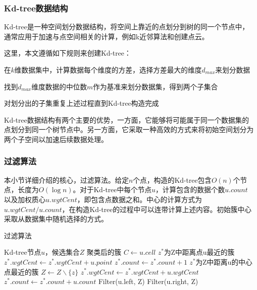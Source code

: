 \subsubsection{Kd-tree数据结构}
Kd-tree是一种空间划分数据结构，将空间上靠近的点划分到树的同一个节点中\cite{el2020kd}，通常应用于加速与点空间相关的计算，例如k近邻算法和创建点云。

这里，本文遵循如下规则来创建Kd-tree：
\begin{compactitem}
	\item 在$ k$维数据集中，计算数据每个维度的方差，选择方差最大的维度$ d_{max} $来划分数据
	\item 找到$ d_{max} $维度数据的中位数$ m $作为基准来划分数据集，得到两个子集合
	\item 对划分出的子集重复上述过程直到Kd-tree构造完成
\end{compactitem}

Kd-tree数据结构有两个主要的优势，一方面，它能够将可能属于同一个数据集的点划分到同一个树节点中。另一方面，它采取一种高效的方式来将初始空间划分为两个子空间以加速后续数据处理。

\subsubsection{过滤算法}
本小节详细介绍\cite{kanungo2002efficient}的核心，过滤算法。给定$ n $个点，构造的Kd-tree包含$ O(n) $个节点，长度为$ O(\log n) $。对于Kd-tree中每个节点$ u $，计算包含的数据个数$ u.count $以及加权质心$ u.wgtCent $，即包含点数据之和。中心的计算方式为$ u.wgtCent/u.count $，在构造Kd-tree的过程中可以连带计算上述内容。初始簇中心采取从数据集中随机选择的方式。
\begin{algorithm}[htbp]
	\renewcommand{\algorithmicrequire}{\textbf{输入:}}
	\renewcommand{\algorithmicensure}{\textbf{输出:}}
	\caption{过滤算法}
	\label{alg_filter}
	\begin{algorithmic}[1]
		\REQUIRE Kd-tree节点$u$，候选集合$Z$
		\ENSURE 聚类后的簇
		\STATE $C \leftarrow u.cell$
		\STATE $z^{*}$为Z中距离点u最近的簇
		\STATE $z^{*}.wgtCent \leftarrow z^{*}.wgtCent + u.point$
		\STATE $ z^{*}.count \leftarrow z^{*}.count + 1 $
		\ELSE
		\STATE $ z^* $为Z中距离u的中心点最近的簇
		\STATE $ Z \leftarrow Z \backslash \{z\} $
		\ENDIF
		\ENDFOR
		\STATE $ z^*.wgtCent\leftarrow z^*.wgtCent+u.wgtCent$
		\STATE $z^*.count\leftarrow z^*.count+u.count$
		\ELSE
		\STATE Filter(u.left, Z)
		\STATE Filter(u.right, Z)
		\ENDIF
		\ENDIF
	\end{algorithmic}
\end{algorithm}

